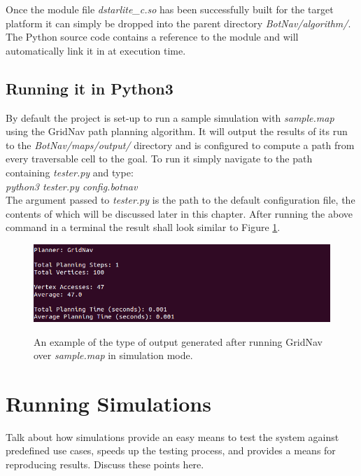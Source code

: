 \noindent
Once the module file \textit{dstarlite\_c.so} has been successfully built for the target platform it can simply be dropped into the parent directory \textit{BotNav/algorithm/}. The Python source code contains a reference to the module and will automatically link it in at execution time. 

\subsection{Running it in Python3}
\noindent
By default the project is set-up to run a sample simulation with \textit{sample.map} using the GridNav path planning algorithm. It will output the results of its run to the \textit{BotNav/maps/output/} directory and is configured to compute a path from every traversable cell to the goal. To run it simply navigate to the path containing \textit{tester.py} and type: \\

\indent \textit{python3 tester.py config.botnav} \\

\noindent
The argument passed to \textit{tester.py} is the path to the default configuration file, the contents of which will be discussed later in this chapter. After running the above command in a terminal the result shall look similar to Figure \ref{sample_output}.

\begin{figure}[htbp]

\center \includegraphics[width=435pt]{illustrations/sample_output}\\
\caption{An example of the type of output generated after running GridNav over \textit{sample.map} in simulation mode.} 
\label{sample_output}

\end{figure}


\section{Running Simulations}
Talk about how simulations provide an easy means to test the system against predefined use cases, speeds up the testing process, and provides a means for reproducing results. Discuss these points here.

